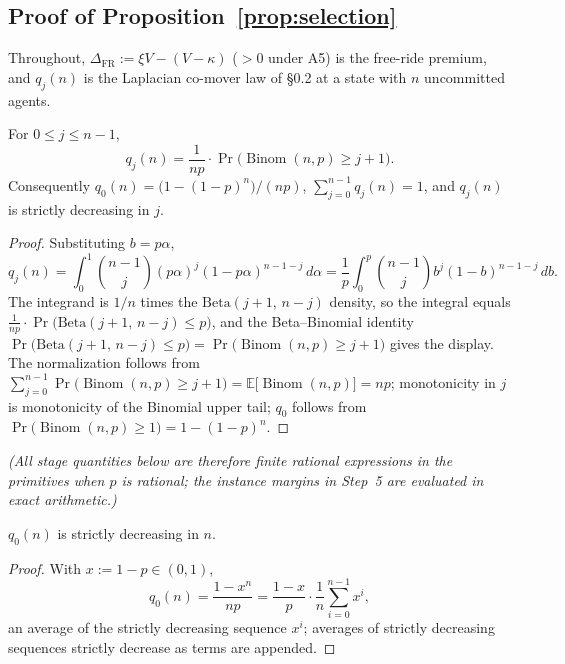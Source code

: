 \subsection*{Proof of Proposition~\ref{prop:selection}}

Throughout, $\Delta_{\mathrm{FR}} := \xi V - (V - \kappa)$ ($> 0$ under A5) is the free-ride premium, and $q_j(n)$ is the Laplacian co-mover law of \S 0.2 at a state with $n$ uncommitted agents.

\begin{lemma}\label{lem:belief}
For $0 \le j \le n-1$,
\[
q_j(n) = \frac{1}{np} \cdot \Pr\bigl( \operatorname{Binom}(n,p) \ge j+1 \bigr).
\]
Consequently $q_0(n) = \bigl(1 - (1-p)^n\bigr)/(np)$, $\sum_{j=0}^{n-1} q_j(n) = 1$, and $q_j(n)$ is strictly decreasing in $j$.
\end{lemma}

\begin{proof}
Substituting $b = p\alpha$,
\[
q_j(n) = \int_0^1 \binom{n-1}{j} (p\alpha)^j (1-p\alpha)^{n-1-j}\, d\alpha
= \frac{1}{p} \int_0^p \binom{n-1}{j} b^j (1-b)^{n-1-j}\, db.
\]
The integrand is $1/n$ times the $\mathrm{Beta}(j+1,\, n-j)$ density, so the integral equals $\frac{1}{np} \cdot \Pr\bigl(\mathrm{Beta}(j+1,\, n-j) \le p\bigr)$, and the Beta--Binomial identity $\Pr\bigl(\mathrm{Beta}(j+1,\, n-j) \le p\bigr) = \Pr\bigl(\operatorname{Binom}(n,p) \ge j+1\bigr)$ gives the display. The normalization follows from $\sum_{j=0}^{n-1} \Pr\bigl(\operatorname{Binom}(n,p) \ge j+1\bigr) = \mathbb{E}\bigl[\operatorname{Binom}(n,p)\bigr] = np$; monotonicity in $j$ is monotonicity of the Binomial upper tail; $q_0$ follows from $\Pr\bigl(\operatorname{Binom}(n,p) \ge 1\bigr) = 1 - (1-p)^n$.
\end{proof}

\noindent\emph{(All stage quantities below are therefore finite rational expressions in the primitives when $p$ is rational; the instance margins in Step~5 are evaluated in exact arithmetic.)}

\begin{lemma}\label{lem:q0mono}
$q_0(n)$ is strictly decreasing in $n$.
\end{lemma}

\begin{proof}
With $x := 1-p \in (0,1)$,
\[
q_0(n) = \frac{1 - x^n}{np} = \frac{1-x}{p} \cdot \frac{1}{n} \sum_{i=0}^{n-1} x^i,
\]
an average of the strictly decreasing sequence $x^i$; averages of strictly decreasing sequences strictly decrease as terms are appended.
\end{proof}

